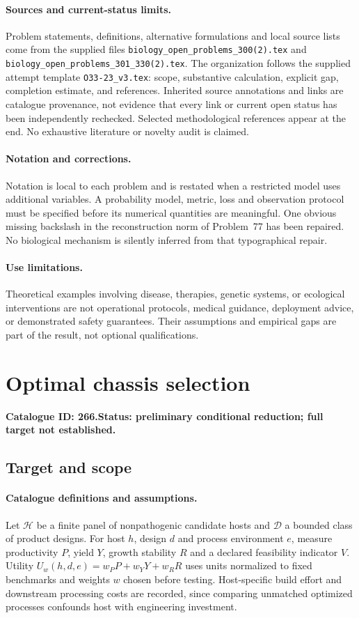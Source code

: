 \documentclass[11pt]{article}
\begin{document}
\paragraph{Sources and current-status limits.}
Problem statements, definitions, alternative formulations and local source lists
come from the supplied files
\texttt{biology\_open\_problems\_300(2).tex} and
\texttt{biology\_open\_problems\_301\_330(2).tex}.
The organization follows the supplied attempt template
\texttt{O33-23\_v3.tex}: scope, substantive calculation, explicit gap,
completion estimate, and references. Inherited source annotations and links are
catalogue provenance, not evidence that every link or current open status has
been independently rechecked. Selected methodological references appear at the
end. No exhaustive literature or novelty audit is claimed.

\paragraph{Notation and corrections.}
Notation is local to each problem and is restated when a restricted model uses
additional variables. A probability model, metric, loss and observation protocol
must be specified before its numerical quantities are meaningful. One obvious
missing backslash in the reconstruction norm of Problem~77 has been repaired.
No biological mechanism is silently inferred from that typographical repair.

\paragraph{Use limitations.}
Theoretical examples involving disease, therapies, genetic systems, or ecological
interventions are not operational protocols, medical guidance, deployment advice,
or demonstrated safety guarantees. Their assumptions and empirical gaps are part
of the result, not optional qualifications.

\setcounter{section}{265}
\section{Optimal chassis selection}
\label{prob:266}
\noindent\textbf{Catalogue ID: 266.}\quad \textbf{Status: preliminary conditional reduction; full target not established.}
\subsection{Target and scope}
\paragraph{Catalogue definitions and assumptions.}
Let $\mathcal H$ be a finite panel of nonpathogenic candidate hosts and $\mathcal D$ a bounded class of product designs. For host $h$, design $d$ and process environment $e$, measure productivity $P$, yield $Y$, growth stability $R$ and a declared feasibility indicator $V$. Utility $U_w(h,d,e)=w_PP+w_YY+w_RR$ uses units normalized to fixed benchmarks and weights $w$ chosen before testing. Host-specific build effort and downstream processing costs are recorded, since comparing unmatched optimized processes confounds host with engineering investment.
\end{document}
